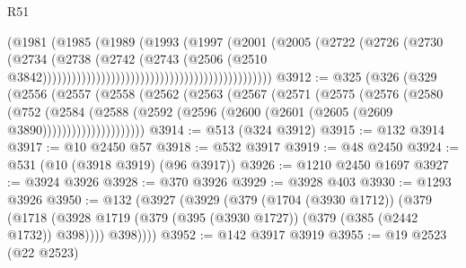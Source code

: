 \begin{lexlean}{R51}
\begin{coremodule}
                                                                  (@1981
                                                                    (@1985
                                                                      (@1989
                                                                        (@1993
                                                                          (@1997
                                                                            (@2001
                                                                              (@2005
                                                                                (@2722
                                                                                  (@2726
                                                                                    (@2730
                                                                                      (@2734
                                                                                        (@2738
                                                                                          (@2742
                                                                                            (@2743
                                                                                              (@2506
                                                                                                (@2510
                                                                                                  @3842)))))))))))))))))))))))))))))))))))))))))))))))
@3912 := @325
    (@326
      (@329
        (@2556
          (@2557
            (@2558
              (@2562
                (@2563
                  (@2567
                    (@2571
                      (@2575
                        (@2576
                          (@2580
                            (@752
                              (@2584
                                (@2588
                                  (@2592
                                    (@2596 (@2600 (@2601 (@2605 (@2609 @3890)))))))))))))))))))))
@3914 := @513 (@324 @3912)
@3915 := @132 @3914
@3917 := @10 @2450 @57
@3918 := @532 @3917
@3919 := @48 @2450
@3924 := @531 (@10 (@3918 @3919) (@96 @3917))
@3926 := @1210 @2450 @1697
@3927 := @3924 @3926
@3928 := @370 @3926
@3929 := @3928 @403
@3930 := @1293 @3926
@3950 := @132
    (@3927
      (@3929
        (@379
          (@1704 (@3930 @1712))
          (@379
            (@1718 (@3928 @1719 (@379 (@395 (@3930 @1727)) (@379 (@385 (@2442 @1732)) @398))))
            @398))))
@3952 := @142 @3917 @3919
@3955 := @19 @2523 (@22 @2523)

\end{coremodule}
\end{lexlean}
